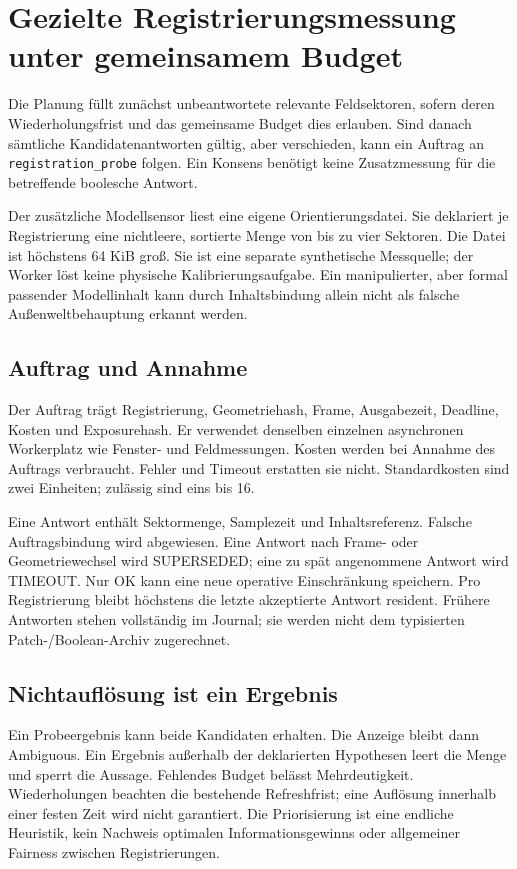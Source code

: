 \documentclass[11pt,a4paper]{article}
\newcommand{\nextsection}[2]{\clearpage{\color{accent}\small\textsf{#1}}\section{#2}}
\begin{document}
\nextsection{48 / AKTIVE UNTERSCHEIDUNG}{Gezielte Registrierungsmessung unter gemeinsamem Budget}
Die Planung füllt zunächst unbeantwortete relevante Feldsektoren,
sofern deren Wiederholungsfrist und das gemeinsame Budget dies erlauben.
Sind danach sämtliche Kandidatenantworten gültig, aber verschieden,
kann ein Auftrag an \texttt{registration\_probe} folgen. Ein Konsens
benötigt keine Zusatzmessung für die betreffende boolesche Antwort.

Der zusätzliche Modellsensor liest eine eigene Orientierungsdatei.
Sie deklariert je Registrierung eine nichtleere, sortierte Menge
von bis zu vier Sektoren. Die Datei ist höchstens 64 KiB groß.
Sie ist eine separate synthetische Messquelle; der Worker löst
keine physische Kalibrierungsaufgabe. Ein manipulierter, aber formal
passender Modellinhalt kann durch Inhaltsbindung allein nicht als
falsche Außenweltbehauptung erkannt werden.

\subsection{Auftrag und Annahme}
Der Auftrag trägt Registrierung, Geometriehash, Frame, Ausgabezeit,
Deadline, Kosten und Exposurehash. Er verwendet denselben einzelnen
asynchronen Workerplatz wie Fenster- und Feldmessungen. Kosten werden
bei Annahme des Auftrags verbraucht. Fehler und Timeout erstatten sie
nicht. Standardkosten sind zwei Einheiten; zulässig sind eins bis 16.

Eine Antwort enthält Sektormenge, Samplezeit und Inhaltsreferenz.
Falsche Auftragsbindung wird abgewiesen. Eine Antwort nach Frame- oder
Geometriewechsel wird SUPERSEDED; eine zu spät angenommene Antwort
wird TIMEOUT. Nur OK kann eine neue operative Einschränkung speichern.
Pro Registrierung bleibt höchstens die letzte akzeptierte Antwort
resident. Frühere Antworten stehen vollständig im Journal; sie
werden nicht dem typisierten Patch-/Boolean-Archiv zugerechnet.

\subsection{Nichtauflösung ist ein Ergebnis}
Ein Probeergebnis kann beide Kandidaten erhalten. Die Anzeige bleibt
dann Ambiguous. Ein Ergebnis außerhalb der deklarierten Hypothesen
leert die Menge und sperrt die Aussage. Fehlendes Budget belässt
Mehrdeutigkeit. Wiederholungen beachten die bestehende Refreshfrist;
eine Auflösung innerhalb einer festen Zeit wird nicht garantiert.
Die Priorisierung ist eine endliche Heuristik, kein Nachweis optimalen
Informationsgewinns oder allgemeiner Fairness zwischen Registrierungen.
\end{document}
